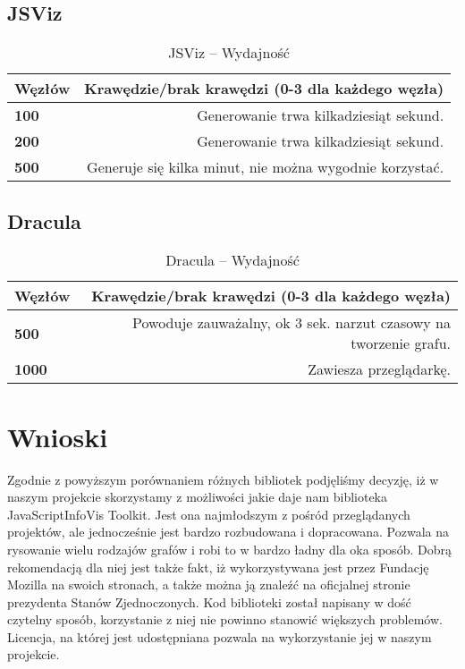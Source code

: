 \subsection{JSViz}

\begin{table}[H]
\begin{tabularx}{\textwidth}{ ||l|R|| }
\hline
\textbf{Węzłów} & \textbf{Krawędzie/brak krawędzi (0-3 dla każdego węzła)} \\
\hline
\textbf{100} & Generowanie trwa kilkadziesiąt sekund. \\
\hline
\textbf{200} & Generowanie trwa kilkadziesiąt sekund.	 \\
\hline
\textbf{500} & Generuje się kilka minut, nie można wygodnie korzystać.  \\
\hline
\end{tabularx}
\caption{JSViz -- Wydajność}
\end{table}

\subsection{Dracula}

\begin{table}[H]
\begin{tabularx}{\textwidth}{ ||l|R|| }
\hline
\textbf{Węzłów} & \textbf{Krawędzie/brak krawędzi (0-3 dla każdego węzła)} \\
\hline
\textbf{500} & Powoduje zauważalny, ok 3 sek. narzut czasowy na tworzenie grafu.  \\
\hline
\textbf{1000} & Zawiesza przeglądarkę. \\
\hline
\end{tabularx}
\caption{Dracula -- Wydajność}
\end{table}

\vfill
\newpage
\section{Wnioski}
Zgodnie z powyższym porównaniem różnych bibliotek podjęliśmy decyzję, iż w naszym projekcie skorzystamy z możliwości jakie daje nam biblioteka JavaScriptInfoVis Toolkit. Jest ona najmłodszym z pośród przeglądanych projektów, ale jednocześnie jest bardzo rozbudowana i dopracowana. Pozwala na rysowanie wielu rodzajów grafów i robi to w bardzo ładny dla oka sposób. Dobrą rekomendacją dla niej jest także fakt, iż wykorzystywana jest przez Fundację Mozilla na swoich stronach, a także można ją znaleźć na oficjalnej stronie prezydenta Stanów Zjednoczonych. Kod biblioteki został napisany w dość czytelny sposób, korzystanie z niej nie powinno stanowić większych problemów. Licencja, na której jest udostępniana pozwala na wykorzystanie jej w naszym projekcie.